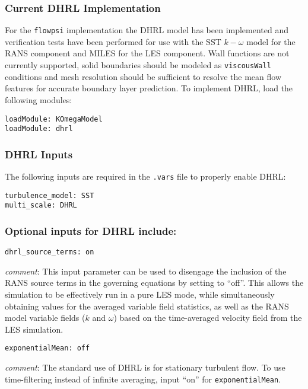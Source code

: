 \subsubsection{Current DHRL Implementation}

For the {\tt flowpsi} implementation the DHRL model has been
implemented and verification tests have been performed for use with
the SST $k-\omega$ model for the RANS component and MILES for the LES
component.  Wall functions are not currently supported, solid
boundaries should be modeled as {\tt viscousWall} conditions and mesh
resolution should be sufficient to resolve the mean flow features for
accurate boundary layer prediction. To implement DHRL, load the
following modules:

\begin{verbatim}
loadModule: KOmegaModel
loadModule: dhrl
\end{verbatim}


\subsubsection{DHRL Inputs}

The following inputs are required in the {\tt .vars} file to properly enable DHRL:

\begin{verbatim}
turbulence_model: SST
multi_scale: DHRL
\end{verbatim}

\subsubsection{Optional inputs for DHRL include:}

\begin{verbatim}
dhrl_source_terms: on 
\end{verbatim}

{\it comment}: This input parameter can be used to disengage the
inclusion of the RANS source terms in the governing equations by
setting to ``off''. This allows the simulation to be effectively run in
a pure LES mode, while simultaneously obtaining values for the
averaged variable field statistics, as well as the RANS model variable
fields ($k$ and $\omega$) based on the time-averaged velocity field
from the LES simulation.

\begin{verbatim}
exponentialMean: off
\end{verbatim}

{\it comment}: The standard use of DHRL is for stationary turbulent
flow. To use time-filtering instead of infinite averaging, input ``on''
for {\tt exponentialMean}.

